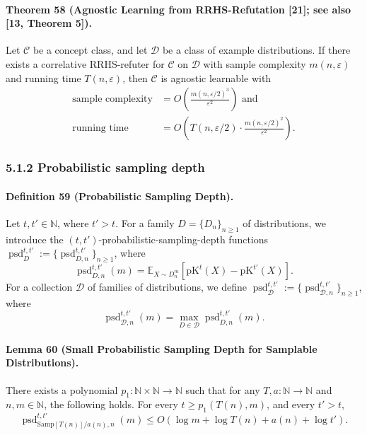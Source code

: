 \paragraph{Theorem 58 (Agnostic Learning from RRHS-Refutation [21]; see also [13, Theorem 5]).} Let $\mathcal C$ be a concept class, and let $\mathcal D$ be a class of example distributions. If there exists a correlative RRHS-refuter for $\mathcal C$ on $\mathcal D$ with sample complexity $m(n,\varepsilon)$ and running time $T(n,\varepsilon)$, then $\mathcal C$ is agnostic learnable with
\begin{align*}
\text{sample complexity}&=O\left(\frac{m(n,\varepsilon/2)^3}{\varepsilon^2}\right)\text{ and}\\
\text{running time}&=O\left(T(n,\varepsilon/2)\cdot\frac{m(n,\varepsilon/2)^2}{\varepsilon^2}\right).
\end{align*}
\subsubsection*{5.1.2 Probabilistic sampling depth}
\paragraph{Definition 59 (Probabilistic Sampling Depth).} Let $t,t'\in\mathbb N$, where $t'>t$. For a family $D=\{D_n\}_{n\geq1}$ of distributions, we introduce the $(t,t')$-probabilistic-sampling-depth functions $\operatorname{psd}_D^{t,t'}:=\{\operatorname{psd}_{D,n}^{t,t'}\}_{n\geq1}$, where
\[\operatorname{psd}_{D,n}^{t,t'}(m)=\mathbb E_{X\sim D_n^m}[\mathrm{pK}^t(X)-\mathrm{pK}^{t'}(X)].\]
For a collection $\mathcal D$ of families of distributions, we define $\operatorname{psd}_{\mathcal D}^{t,t'}:=\{\operatorname{psd}_{\mathcal D,n}^{t,t'}\}_{n\geq1}$, where
\[\operatorname{psd}_{\mathcal D,n}^{t,t'}(m)=\max_{D\in\mathcal D}\operatorname{psd}_{D,n}^{t,t'}(m).\]
\paragraph{Lemma 60 (Small Probabilistic Sampling Depth for Samplable Distributions).} There exists a polynomial $p_1:\mathbb N\times\mathbb N\to\mathbb N$ such that for any $T,a:\mathbb N\to\mathbb N$ and $n,m\in\mathbb N$, the following holds. For every $t\geq p_1(T(n),m)$, and every $t'>t$,
\[\operatorname{psd}_{\mathrm{Samp}[T(n)]/a(n),n}^{t,t'}(m)\leq O(\log m+\log T(n)+a(n)+\log t').\]
